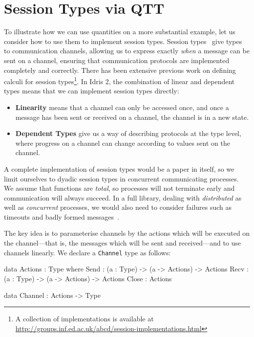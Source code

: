 \section{Session Types via QTT}

\label{sec:sessions}

To illustrate how we can use quantities on a more
substantial example, let us consider how to use them to implement session
types. Session types~\cite{Honda1993,Honda2008} give types to communication channels, allowing us to
express exactly \emph{when} a message can be sent on a channel, ensuring that
communication protocols are implemented completely and correctly. There has
been extensive previous work on defining calculi for session types\footnote{A collection of implementations is available
at \url{http://groups.inf.ed.ac.uk/abcd/session-implementations.html}}. In
Idris 2, the combination of linear and dependent types means that we can
implement session types directly:

\begin{itemize}
\item \textbf{Linearity} means that a channel can only be accessed once, 
and once a message has been sent or received on a channel, the channel is
in a new state.
\item \textbf{Dependent Types} give us a way of describing protocols at the
type level, where progress on a channel can change according to values sent
on the channel.
\end{itemize}

A complete implementation of session types would be
a paper in itself, so we limit ourselves to dyadic session types in concurrent
communicating processes.  We assume that functions are \emph{total}, so
processes will not terminate early and communication will always
succeed. In a full library, dealing with \emph{distributed} as
well as \emph{concurrent} processes, we would also need to consider failures
such as timeouts and badly formed messages~\cite{Fowler2019}.

The key idea is to parameterise channels by the actions which will be
executed on the channel---that is, the messages which will be
sent and received---and to use channels linearly. We declare a
\texttt{Channel} type as follows:

\begin{code}
data Actions : Type where
     Send : (a : Type) -> (a -> Actions) -> Actions
     Recv : (a : Type) -> (a -> Actions) -> Actions
     Close : Actions

data Channel : Actions -> Type
\end{code}

